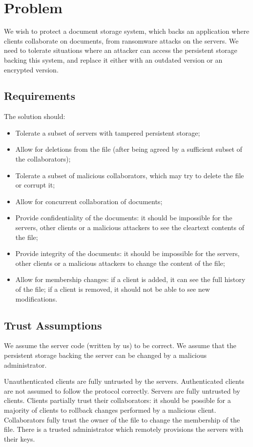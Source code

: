 \section{Problem}

We wish to protect a document storage system, which backs an
application where clients collaborate on documents, from
ransomware attacks on the servers. We need to tolerate situations
where an attacker can access the persistent storage backing this
system, and replace it either with an outdated version or an
encrypted version.

\subsection{Requirements}
The solution should:
\begin{itemize}
    \setlength{\itemsep}{0pt}
    \setlength{\parskip}{0pt}
    \setlength{\parsep}{0pt}
    \item Tolerate a subset of servers with tampered
        persistent storage;
    \item Allow for deletions from the file (after being
        agreed by a sufficient subset of the collaborators);
    \item Tolerate a subset of malicious collaborators, which
        may try to delete the file or corrupt it;
    \item Allow for concurrent collaboration of documents;
    \item Provide confidentiality of the documents: it should
        be impossible for the servers, other clients or a
        malicious attackers to see the cleartext contents of
        the file;
    \item Provide integrity of the documents: it should
        be impossible for the servers, other clients or a
        malicious attackers to change the content of
        the file;
    \item Allow for membership changes: if a client is added,
        it can see the full history of the file; if a client
        is removed, it should not be able to see new
        modifications.
\end{itemize}

\subsection{Trust Assumptions}
We assume the server code (written by us) to be correct. We
assume that the persistent storage backing the server can be
changed by a malicious administrator.

Unauthenticated clients are fully untrusted by the servers.
Authenticated clients are not assumed to follow the protocol
correctly. Servers are fully untrusted by clients. Clients
partially trust their collaborators: it should be possible for
a majority of clients to rollback changes performed by a malicious client.
Collaborators fully trust the owner of the file to change the
membership of the file. There is a trusted administrator which
remotely provisions the servers with their keys.


